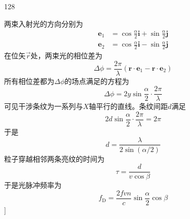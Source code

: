 \begin{solution}{128}
\begin{subsolution}
        两束入射光的方向分别为
        \begin{align}
            \boldsymbol {e} _ {1} &= \cos \frac {\alpha}{2} \boldsymbol {i} + \sin \frac {\alpha}{2} \boldsymbol {j} \label{eq:18.s128} \\
            \boldsymbol {e} _ {2} &= \cos \frac {\alpha}{2} \boldsymbol {i} - \sin \frac {\alpha}{2} \boldsymbol {j} \label{eq:19.s128}
        \end{align}
        在位矢$\vec { r }$处，两束光的相位差为
        \begin{equation}
            \Delta \phi = \frac {2 \pi}{\lambda} (\boldsymbol {r} \cdot \boldsymbol {e} _ {1} - \boldsymbol {r} \cdot \boldsymbol {e} _ {2})
            \label{eq:20.s128}
        \end{equation}
        所有相位差都为$\Delta \phi$的场点满足的方程为
        \begin{equation}
            \Delta \phi = 2 y \sin {\frac {\alpha}{2}} \cdot \frac {2 \pi}{\lambda}
            \label{eq:21.s128}
        \end{equation}
        可见干涉条纹为一系列与$X$轴平行的直线。条纹间距$d$满足
        \begin{equation}
            2 d \sin {\frac {\alpha}{2}} \cdot \frac {2 \pi}{\lambda} = 2 \pi
            \label{eq:22.s128}
        \end{equation}
        于是
        \begin{equation}
            d = \frac {\lambda}{2 \sin (\alpha / 2)}
            \label{eq:23.s128}
        \end{equation}
        粒子穿越相邻两条亮纹的时间为
        \begin{equation}
            \tau = \frac {d}{v \cos \beta}
            \label{eq:24.s128}
        \end{equation}
        于是光脉冲频率为
        \begin{equation}
            f _ {\mathrm{D}} = \frac {2 f v n}{c} \sin \frac {\alpha}{2} \cos \beta
            \label{eq:25.s128}
        \end{equation}
        ]
    \end{subsolution}
\end{solution}